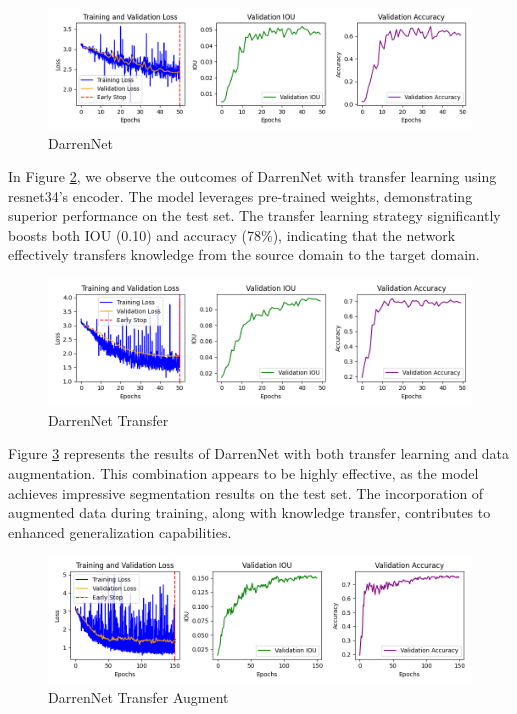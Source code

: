 \begin{figure}[H]
	\centering
	\includegraphics[width=\textwidth]{plots/darrennet}
	\caption{DarrenNet}
	\label{fig:darren}
\end{figure}


In Figure \ref{fig:darren_transfer}, we observe the outcomes of DarrenNet with transfer learning using resnet34's encoder. The model leverages pre-trained weights, demonstrating superior performance on the test set. The transfer learning strategy significantly boosts both IOU (0.10) and accuracy (78\%), indicating that the network effectively transfers knowledge from the source domain to the target domain.


\begin{figure}[H]
	\centering
	\includegraphics[width=\textwidth]{plots/darrennet_transfer}
	\caption{DarrenNet Transfer}
	\label{fig:darren_transfer}
\end{figure}


Figure \ref{fig:darren_transfer_aug} represents the results of DarrenNet with both transfer learning and data augmentation. This combination appears to be highly effective, as the model achieves impressive segmentation results on the test set. The incorporation of augmented data during training, along with knowledge transfer, contributes to enhanced generalization capabilities.

\begin{figure}[H]
	\centering
	\includegraphics[width=\textwidth]{plots/darrennet_transfer_augment}
	\caption{DarrenNet Transfer Augment}
	\label{fig:darren_transfer_aug}
\end{figure}


